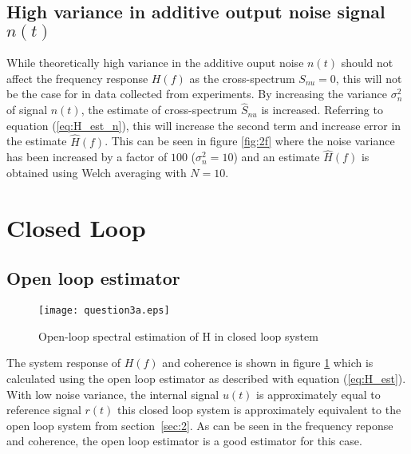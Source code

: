 \documentclass[11pt,a4paper]{article}
\begin{document}
\subsection{High variance in additive output noise signal $n(t)$}
While theoretically high variance in the additive ouput noise $n(t)$ should not
affect the frequency response $H(f)$ as the cross-spectrum $S_{nu} = 0$, this
will not be the case for in data collected from experiments. By increasing the
variance $\sigma_n^2$ of signal $n(t)$, the estimate of cross-spectrum
$\hat{S}_{nu}$ is increased. Referring to equation (\ref{eq:H_est_n}), this
will increase the second term and increase error in the estimate $\hat{H}(f)$.
This can be seen in figure \ref{fig:2f} where the noise variance has been
increased by a factor of $100$ ($\sigma_n^2 = 10$) and an estimate $\hat{H}(f)$
is obtained using Welch averaging with $N = 10$.

\section{Closed Loop}

\subsection{Open loop estimator}
\begin{figure}
    \begin{center}
        \texttt{[image: question3a.eps]}
    \end{center}
    \caption{Open-loop spectral estimation of H in closed loop system}
    \label{fig:3a}
\end{figure}
The system response of $H(f)$ and coherence is shown in figure \ref{fig:3a}
which is calculated using the open loop estimator as described with equation
(\ref{eq:H_est}). With low noise variance, the internal signal $u(t)$ is
approximately equal to reference signal $r(t)$ this closed loop system is
approximately equivalent to the open loop system from section~\ref{sec:2}. As
can be seen in the frequency reponse and coherence, the open loop estimator is
a good estimator for this case.

\end{document}
